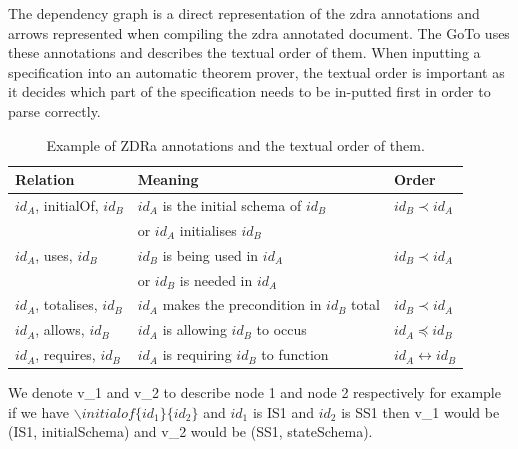 The dependency graph is a direct representation of the \gls{zdra} annotations
and arrows represented when compiling the \gls{zdra} annotated document. The
GoTo uses these annotations and describes the textual order of them. When
inputting a specification into an automatic theorem prover, the textual order is
important as it decides which part of the specification needs to be in-putted
first in order to parse correctly.

\begin{table}[H]
\centering
\begin{tabular}{| l | l | l |}
\hline
\textbf{Relation} & \textbf{Meaning} & \textbf{Order} \\
\hline 
$id_{A}$, initialOf, $id_{B}$ & $id_{A}$ is the initial schema of $id_{B}$ &
$id_{B} \prec id_{A}$ \\
 & or $id_{A}$ initialises $id_{B}$ & \\
 \hline
$id_{A}$, uses, $id_{B}$ & $id_{B}$ is being used in $id_{A}$ & $id_{B} \prec
id_{A}$ \\
& or $id_{B}$ is needed in $id_{A}$ & \\
 \hline
 $id_{A}$, totalises, $id_{B}$ & $id_{A}$ makes the precondition in $id_{B}$
 total & $id_{B} \prec id_{A}$ \\
 \hline
$id_{A}$, allows, $id_{B}$ & $id_{A}$ is allowing $id_{B}$ to occus & $id_{A}
\preceq id_{B}$ \\
\hline
$id_{A}$, requires, $id_{B}$ & $id_{A}$ is requiring $id_{B}$ to function &
$id_{A} \leftrightarrow id_{B}$ \\
\hline
\end{tabular}
\caption{Example of ZDRa annotations and the textual order of them. \label{tab:texorder}}
\end{table}

\begin{defin}
We denote v\_1 and v\_2 to describe node 1 and node 2 respectively for example
if we have $\backslash initialof\{id_{1}\}\{id_{2}\}$ and $id_{1}$ is IS1 and
$id_{2}$ is SS1 then v\_1 would be (IS1, initialSchema) and v\_2 would be (SS1,
stateSchema).
\end{defin}

